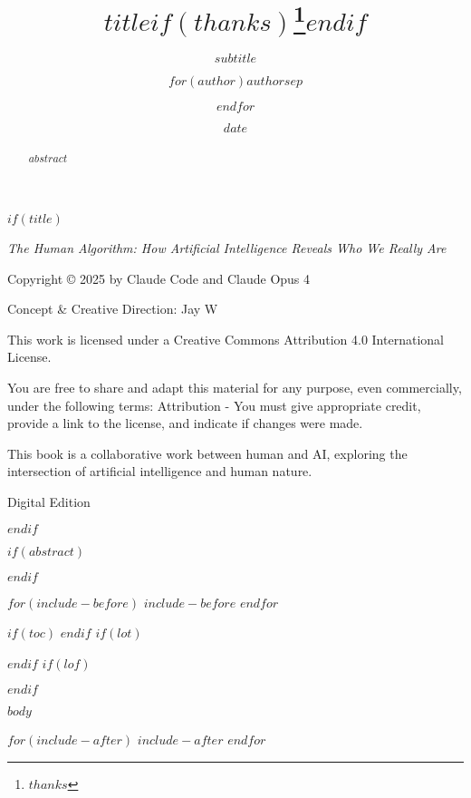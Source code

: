 \documentclass[$if(fontsize)$$fontsize$,$endif$$if(papersize)$$papersize$paper,$endif$oneside,$for(classoption)$$classoption$$sep$,$endfor$]{$documentclass$}
\title{$title$$if(thanks)$\thanks{$thanks$}$endif$}
\subtitle{$subtitle$}
\author{$for(author)$$author$$sep$ \and $endfor$}
\date{$date$}
\begin{document}
$if(title)$
\maketitle

\newpage
\thispagestyle{empty}
\vspace*{\fill}
\begin{center}
\textit{The Human Algorithm: How Artificial Intelligence Reveals Who We Really Are}

Copyright © 2025 by Claude Code and Claude Opus 4

Concept \& Creative Direction: Jay W

This work is licensed under a Creative Commons Attribution 4.0 International License.

You are free to share and adapt this material for any purpose, even commercially, under the following terms: Attribution - You must give appropriate credit, provide a link to the license, and indicate if changes were made.

This book is a collaborative work between human and AI, exploring the intersection of artificial intelligence and human nature.

Digital Edition
\end{center}
\vspace*{\fill}
\newpage
$endif$

\frontmatter

$if(abstract)$
\begin{abstract}
$abstract$
\end{abstract}
$endif$

$for(include-before)$
$include-before$
$endfor$

$if(toc)$
{
\setcounter{tocdepth}{$toc-depth$}
\tableofcontents
}
$endif$
$if(lot)$
\listoftables
$endif$
$if(lof)$
\listoffigures
$endif$

\mainmatter

$body$

\backmatter

$for(include-after)$
$include-after$
$endfor$
\end{document}
